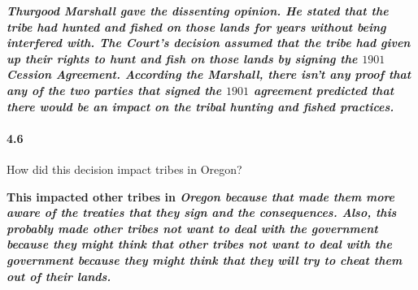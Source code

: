 \bf{\it{Thurgood Marshall} gave the dissenting opinion.
    He stated that the tribe had hunted and fished on those lands for years
    without being interfered with. The Court's decision assumed that the tribe
    had given up their rights to hunt and fish on those lands by signing the
    $1901$ Cession Agreement. According the \it{Marshall}, there isn't any proof
    that any of the two parties that signed the $1901$ agreement predicted that
    there would be an impact on the tribal hunting and fished practices.}


\paragraph{4.6} How did this decision impact tribes in Oregon?

\bf{This impacted other tribes in \it{Oregon} because that made them more aware
    of the treaties that they sign and the consequences. Also, this probably
    made other tribes not want to deal with the government because they might
    think that other tribes not want to deal with the government because they
    might think that they will try to cheat them out of their lands.}
